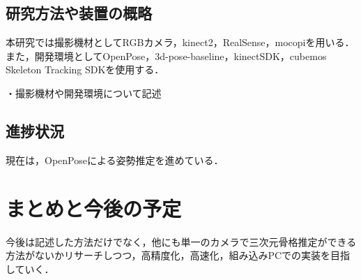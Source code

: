 \documentclass[titlepage]{jarticle}
\begin{document}
\subsection{研究方法や装置の概略}
%
本研究では撮影機材としてRGBカメラ，kinect2，RealSense，mocopiを用いる．また，開発環境としてOpenPose，3d-pose-baseline，kinectSDK，cubemos Skeleton Tracking SDKを使用する．

・撮影機材や開発環境について記述



%

%
%
%
\subsection{進捗状況}
%
現在は，OpenPoseによる姿勢推定を進めている．
%
%
%

%

%
%
%
\section{まとめと今後の予定}
%
今後は記述した方法だけでなく，他にも単一のカメラで三次元骨格推定ができる方法がないかリサーチしつつ，高精度化，高速化，組み込みPCでの実装を目指していく．
%
%

\begin{thebibliography}{99}
  \small{
  }
\end{thebibliography}
\end{document}
